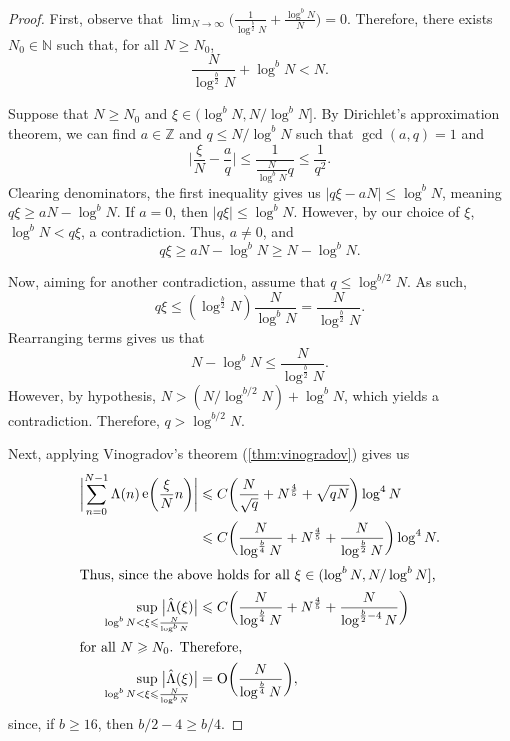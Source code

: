 \documentclass[letterpaper, 12pt]{article}
\theoremstyle{plain}
\theoremstyle{definition}
\theoremstyle{plain}
\theoremstyle{plain}
\numberwithin{equation}{section}
\newcommand{\Oh}{{\rm O}}
\newcommand{\N}{\mathbb{N}}
\newcommand{\Z}{\mathbb{Z}}
\renewcommand{\leq}{\leqslant}
\renewcommand{\geq}{\geqslant}
\newcommand{\1}{\textbf{1}}
\DeclareMathOperator{\e}{e}
\begin{document}
\begin{proof}
    First, observe that 
    $\displaystyle \lim_{N \to \infty} \biggl(\frac{1}{\log^{\frac{b}{2}} N} + \frac{\log^b N}{N} \biggr) = 0$. 
    Therefore, there exists $N_0 \in \N$ such that, for all \(N \geq N_0\),
    \[
        \frac{N}{\log^{\frac{b}{2}} N} + \log^b N < N.
    \]
    
    Suppose that $N \geq N_0$ and $\xi \in (\log^b N, N/\log^b N]$. By Dirichlet's approximation theorem, we can find $a \in \Z$ and $q \leq N/\log^b N$ such that $\gcd(a, q) = 1$ and 
    \[
        \biggl\lvert\frac{\xi}{N} - \frac{a}{q} \biggr\rvert 
        \leq \frac{1}{\frac{N}{\log^b N} q} \leq \frac{1}{q^2}.
    \]
    Clearing denominators, the first inequality gives us \(\lvert q\xi - aN \rvert \leq \log^b N\), meaning \(q\xi \geq aN - \log^b N\). If \(a = 0\), then $\lvert q\xi \rvert \leq \log^b N$. However, by our choice of \(\xi\), $\log^b N < q\xi$, a contradiction. Thus, \(a \neq 0\), and
    \begin{equation*}
         q\xi \geq aN - \log^b N \geq N - \log^b N.
    \end{equation*}
    
    Now, aiming for another contradiction, assume that $q \leq \log^{b/2} N$. As such, 
    \begin{equation*}
        q\xi \leq (\log^{\frac{b}{2}} N) \frac{N}{\log^b N}
        = \frac{N}{\log^{\frac{b}{2}} N}.
    \end{equation*}
    Rearranging terms gives us that
    \begin{equation*}
        N - \log^b N \leq \frac{N}{\log^{\frac{b}{2}} N}.
    \end{equation*}
    However, by hypothesis, \(N > (N/\log^{b/2} N) + \log^b N\), which yields a contradiction. Therefore, $q > \log^{b/2} N$.
    
    Next, applying Vinogradov's theorem (\cref{thm:vinogradov}) gives us
    \begin{align*}
        \biggl\lvert \sum_{n = 0}^{N - 1} \Lambda(n) \e\biggl(\frac{\xi}{N}n \biggr) \biggr\rvert
        &\leq C \biggl(\frac{N}{\sqrt{q}} + N^{\frac{4}{5}} + \sqrt{qN} \biggr) \log^4 N\\
        &\leq C \biggl(\frac{N}{\log^{\frac{b}{4}} N} + N^{\frac{4}{5}} + \frac{N}{\log^{\frac{b}{2}} N} \biggr) \log^4 N.\\
    \intertext{Thus, since the above holds for all $\xi \in (\log^b N, N/\log^b N]$,}
        \sup_{\mathclap{\log^b N < \xi \leq \frac{N}{\log^b N}}}\; \bigl\lvert \hat{\Lambda}(\xi) \bigr\rvert 
        &\leq C \biggl(\frac{N}{\log^{\frac{b}{4}} N} + N^{\frac{4}{5}} +\frac{N}{\log^{\frac{b}{2} - 4} N}\biggr)\\
    \intertext{for all $N \geq N_0$. Therefore,}
         \sup_{\mathclap{\log^b N < \xi \leq \frac{N}{\log^b N}}}\; \bigl\lvert \hat{\Lambda}(\xi) \bigr\rvert
         &= \Oh\biggl(\frac{N}{\log^{\frac{b}{4}} N} \biggr),
    \end{align*}
    since, if $b \geq 16$, then $b/2 - 4 \geq b/4$.
\end{proof}
\end{document}
